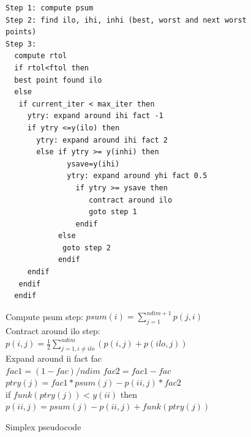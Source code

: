 \begin{figure}[!htb]
\begin{verbatim}
Step 1: compute psum
Step 2: find ilo, ihi, inhi (best, worst and next worst points)
Step 3:
  compute rtol
  if rtol<ftol then
  best point found ilo
  else
   if current_iter < max_iter then
     ytry: expand around ihi fact -1
     if ytry <=y(ilo) then
       ytry: expand around ihi fact 2
       else if ytry >= y(inhi) then
              ysave=y(ihi)
              ytry: expand around yhi fact 0.5
                if ytry >= ysave then
                   contract around ilo
                   goto step 1
                endif
            else
             goto step 2
            endif
     endif
   endif
  endif
\end{verbatim}
Compute psum step: $psum(i)=\sum_{j=1}^{ndim+1}p(j,i)$\\
Contract around ilo step: $p(i,j)=\frac{1}{2}\sum_{j=1, i\neq ilo}^{ndim}(p(i,j)+p(ilo,j))$\\
Expand around ii fact fac\\
$fac1=(1-fac)/ndim$ $fac2=fac1-fac$\\
$ptry(j)=fac1*psum(j)-p(ii,j)*fac2$\\
if $funk(ptry(j))<y(ii)$ then $p(ii,j)=psum(j)-p(ii,j)+funk(ptry(j))$
\caption{Simplex pseudocode}
\label{simplex}
\end{figure}
